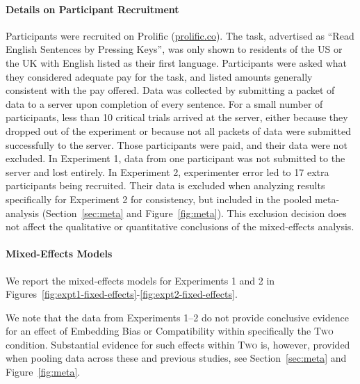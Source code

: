 \paragraph{Details on Participant Recruitment}
Participants were recruited on Prolific (\url{prolific.co}). The task, advertised as ``Read English Sentences by Pressing Keys'', was only shown to residents of the US or the UK with English listed as their first language.
Participants were asked what they considered adequate pay for the task, and listed amounts generally consistent with the pay offered.
Data was collected by submitting a packet of data to a server upon completion of every sentence.
For a small number of participants, less than 10 critical trials arrived at the server, either because they dropped out of the experiment or because not all packets of data were submitted successfully to the server.
Those participants were paid, and their data were not excluded.
In Experiment 1, data from one participant was not submitted to the server and lost entirely.
In Experiment 2, experimenter error led to 17 extra participants being recruited. Their data is excluded when analyzing results specifically for Experiment 2 for consistency, but included in the pooled meta-analysis (Section~\ref{sec:meta} and Figure~\ref{fig:meta}).
This exclusion decision does not affect the qualitative or quantitative conclusions of the mixed-effects analysis.

\paragraph{Mixed-Effects Models}
We report the mixed-effects models for Experiments 1 and 2 in Figures~\ref{fig:expt1-fixed-effects}-\ref{fig:expt2-fixed-effects}.

We note that the data from Experiments 1--2 do not provide conclusive evidence for an effect of Embedding Bias or Compatibility within specifically the \textsc{Two} condition. 
Substantial evidence for such effects within \textsc{Two} is, however, provided when pooling data across these and previous studies, see Section~\ref{sec:meta} and Figure~\ref{fig:meta}.




